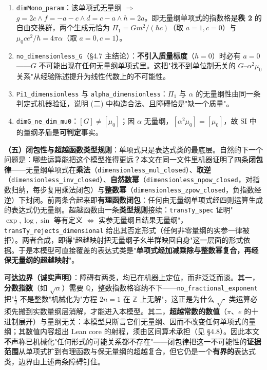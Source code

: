 \documentclass[12pt,a4paper]{article}
\begin{document}
\begin{enumerate}
  \item \texttt{dimMono\_\allowbreak{}param}：该单项式无量纲 $\Rightarrow$ $g = 2c \wedge f = -a-c \wedge d = c-a \wedge h = 2a$。即无量纲单项式的指数格是\textbf{秩 2} 的自由交换群，两个生成元恰为 $\Pi_1 = Gm^2/(\hbar c)$（取 $a=1,c=0$）与 $\mu_0 c e^2/\hbar = 4\pi\alpha$（取 $a=0,c=1$）。
  \item \texttt{no\_\allowbreak{}dimensionless\_\allowbreak{}G}（\S4.7 主结论）：\textbf{不引入质量标度}（$h=0$）时必有 $a=0$——$G$ 不可能出现在任何无量纲单项式里。这把"找不到单位制无关的 $G$–$\alpha^2\mu_0$ 关系"从经验陈述提升为线性代数上的不可能性。
  \item \texttt{Pi1\_\allowbreak{}dimensionless} 与 \texttt{alpha\_\allowbreak{}dimensionless}：$\Pi_1$ 与 $\alpha$ 的无量纲性由同一条判定式机器验证，说明 (二) 中构造合法、且障碍恰是"缺一个质量"。
  \item \texttt{dimG\_\allowbreak{}ne\_\allowbreak{}dim\_\allowbreak{}mu0}：$[G] \neq [\mu_0]$；因 $\alpha$ 无量纲，$[\alpha^2\mu_0] = [\mu_0]$，故 SI 中的量纲矛盾是\textbf{可判定}事实。
\end{enumerate}

\textbf{（五）闭包性与超越函数类型规则}：单项式只是表达式类的最底层。自然的下一个问题是：哪些运算能把这个模型推得更远？本文在同一文件里机器证明了四条\textbf{闭包律}——无量纲单项式在\textbf{乘法}（\texttt{dimensionless\_\allowbreak{}mul\_\allowbreak{}closed}）、\textbf{取逆}（\texttt{dimensionless\_\allowbreak{}inv\_\allowbreak{}closed}）、\textbf{自然数幂}（\texttt{dimensionless\_\allowbreak{}npow\_\allowbreak{}closed}，对指数归纳，每步复用乘法闭包）与\textbf{整数幂}（\texttt{dimensionless\_\allowbreak{}zpow\_\allowbreak{}closed}，负指数经逆）下封闭。前两条合起来即\textbf{有理函数闭包}：任何由无量纲单项式经四则运算生成的表达式仍无量纲。超越函数由一条\textbf{类型规则}接续：\texttt{transTy\_\allowbreak{}spec} 证明"$\exp,\log,\sin$ 等有定义 $\iff$ 实参无量纲且结果无量纲"，\texttt{transTy\_\allowbreak{}rejects\_\allowbreak{}dimensional} 给出其否定形式（任何非零量纲的实参一律被拒）。两者合成，即得"超越映射把无量纲子幺半群映回自身"这一层面的形式依据。于是本模型可直接覆盖的表达式类是"\textbf{单项式经加减乘除与整数幂复合，再经保无量纲的超越映射}"。

\textbf{可达边界（诚实声明）}：障碍有两类，均已在机器上定位，而非泛泛而谈。其一，\textbf{分数指数}（如 $\sqrt{\alpha}$）需要 $\mathbb{Q}$，整数指数格容纳不下——\texttt{no\_\allowbreak{}fractional\_\allowbreak{}exponent} 把"$\tfrac12$ 不是整数"机械化为"方程 $2n=1$ 在 $\mathbb{Z}$ 上无解"，这正是为什么 $\sqrt{\cdot}$ 类运算必须先搬到实数量纲层消解，才能进入本模型。其二，\textbf{超越常数的数值}（$\pi$、$e$ 的十进制展开）与量纲无关：本模型只断言它们无量纲、因而不改变任何单项式的量纲；其数值内容超出 Lean core 的射程，须由区间算术承担（见 \S4.8）。因此本文\textbf{不}声称已机械化"任何形式的可能关系都不存在"——闭包律把这一不可能性的\textbf{证据范围}从单项式扩到有理函数与保无量纲的超越复合，但它仍是一个\textbf{有界的}表达式类，边界由上述两条障碍钉住。
\end{document}
